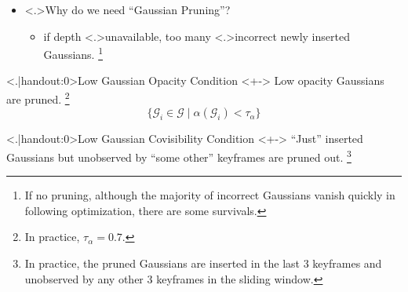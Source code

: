 \begin{frame}
	\begin{itemize}
		\item<+-> \alert<.>{Why} do we need ``Gaussian Pruning''?
			\mode<presentation>{\vspace*{1.5ex}}
			\begin{itemize}
				\item<+-> if depth \alert<.>{unavailable}, too many \alert<.>{incorrect} newly inserted Gaussians.
					\footnote{If no pruning, although the majority of incorrect Gaussians vanish quickly in following optimization, there are some survivals.}
			\end{itemize}
	\end{itemize}
	\begin{block}{\alert<.|handout:0>{Low Gaussian Opacity} \hfill Condition }<+->
		Low opacity Gaussians are pruned.
		\footnote{In practice, \(\tau_{\alpha}=0.7\).}
		\begin{equation}
			\{\mathcal{G}_i \in \mathcal{G}\;\vert\;\alpha(\mathcal{G}_i) < \tau_{\alpha} \}
		\end{equation}
	\end{block}
	\begin{block}{\alert<.|handout:0>{Low Gaussian Covisibility} \hfill Condition }<+->
		``Just'' inserted Gaussians but unobserved by ``some other'' keyframes are pruned out.
		\footnote{In practice, the pruned Gaussians are inserted in the last 3 keyframes and unobserved by any other 3 keyframes in the sliding window.}
	\end{block}
\end{frame}

